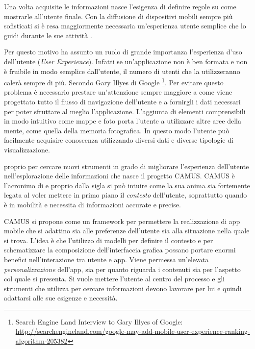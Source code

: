 
Una volta acquisite le informazioni nasce l'esigenza di definire regole su come mostrarle all'utente finale. Con la diffusione di dispositivi mobili sempre più sofisticati si è resa maggiormente necessaria un'esperienza utente semplice che lo guidi durante le sue attività .


Per questo motivo ha assunto un ruolo di grande importanza l'esperienza d'uso dell'utente (\emph{User Experience}). Infatti se un'applicazione non è ben formata e non è fruibile in modo semplice dall'utente, il numero di utenti che la utilizzeranno calerà sempre di più. Secondo Gary Illyes di Google \footnote{Search Engine Land Interview to Gary Illyes of Google: \url{http://searchengineland.com/google-may-add-mobile-user-experience-ranking-algorithm-205382}}. Per evitare questo problema è necessario prestare un'attenzione sempre maggiore a come viene progettato tutto il flusso di navigazione dell'utente e a fornirgli i dati necessari per poter sfruttare al meglio l'applicazione. L'aggiunta di elementi comprensibili in modo intuitivo come mappe e foto porta l'utente a utilizzare altre aree della mente, come quella della memoria fotografica. In questo modo l'utente può facilmente acquisire conoscenza utilizzando diversi dati e diverse tipologie di visualizzazione.


\upe proprio per cercare nuovi strumenti in grado di migliorare l'esperienza dell'u\-ten\-te nell'esplorazione delle informazioni che nasce il progetto CAMUS. CAMUS è l'a\-cro\-ni\-mo di  e proprio dalla sigla si può intuire come la sua anima sia fortemente legata al voler mettere in primo piano il \emph{contesto} dell'utente, soprattutto quando è in mobilità e necessita di informazioni accurate e precise.

CAMUS si propone come un framework per permettere la realizzazione di app mobile che si adattino sia alle preferenze dell'utente sia alla situazione nella quale si trova. L'idea è che l'utilizzo di modelli per definire il contesto e per schematizzare la composizione dell'interfaccia grafica possano portare enormi benefici nell'interazione tra utente e app. Viene permessa un'elevata \emph{personalizzazione} dell'app, sia per quanto riguarda i contenuti sia per l'aspetto col quale si presenta. Si vuole mettere l'utente al centro del processo e gli strumenti che utilizza per cercare informazioni devono lavorare per lui e quindi adattarsi alle sue esigenze e necessità.

